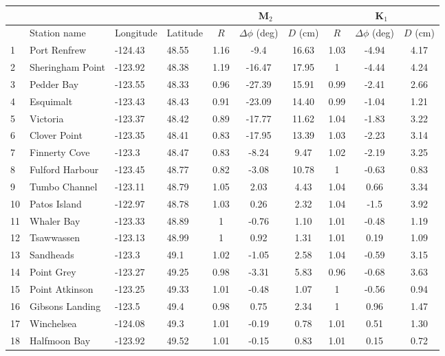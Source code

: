 \documentclass[pdftex,10pt]{article}
\begin{document}
\begin{table}[h]
\centering 
\begin{tabular}{l l l l c c c c c c} 
\hline 
& & & & \multicolumn{3}{c}{M$_2$} & \multicolumn{3}{c}{K$_1$} \\ 
\hline 
            & Station name     & Longitude & Latitude & $R$ & $ \Delta \phi$ (deg) & $D$ (cm) & $R$ & $ \Delta \phi$ (deg) & $D$ (cm) \\
\hline 
1 & Port Renfrew & -124.43 & 48.55 & 1.16 & -9.4 & 16.63  & 1.03 & -4.94 & 4.17 \\
2 & Sheringham Point & -123.92 & 48.38 & 1.19 & -16.47 & 17.95  & 1 & -4.44 & 4.24 \\
3 & Pedder Bay & -123.55 & 48.33 & 0.96 & -27.39 & 15.91  & 0.99 & -2.41 & 2.66 \\
4 & Esquimalt & -123.43 & 48.43 & 0.91 & -23.09 & 14.40  & 0.99 & -1.04 & 1.21 \\
5 & Victoria & -123.37 & 48.42 & 0.89 & -17.77 & 11.62  & 1.04 & -1.83 & 3.22 \\
6 & Clover Point & -123.35 & 48.41 & 0.83 & -17.95 & 13.39  & 1.03 & -2.23 & 3.14 \\
7 & Finnerty Cove & -123.3 & 48.47 & 0.83 & -8.24 & 9.47  & 1.02 & -2.19 & 3.25 \\
8 & Fulford Harbour & -123.45 & 48.77 & 0.82 & -3.08 & 10.78  & 1 & -0.63 & 0.83 \\
9 & Tumbo Channel & -123.11 & 48.79 & 1.05 & 2.03 & 4.43  & 1.04 & 0.66 & 3.34 \\
10 & Patos Island & -122.97 & 48.78 & 1.03 & 0.26 & 2.32  & 1.04 & -1.5 & 3.92 \\
11 & Whaler Bay & -123.33 & 48.89 & 1 & -0.76 & 1.10  & 1.01 & -0.48 & 1.19 \\
12 & Tsawwassen & -123.13 & 48.99 & 1 & 0.92 & 1.31  & 1.01 & 0.19 & 1.09 \\
13 & Sandheads & -123.3 & 49.1 & 1.02 & -1.05 & 2.58  & 1.04 & -0.59 & 3.15 \\
14 & Point Grey & -123.27 & 49.25 & 0.98 & -3.31 & 5.83  & 0.96 & -0.68 & 3.63 \\
15 & Point Atkinson & -123.25 & 49.33 & 1.01 & -0.48 & 1.07  & 1 & -0.56 & 0.94 \\
16 & Gibsons Landing & -123.5 & 49.4 & 0.98 & 0.75 & 2.34  & 1 & 0.96 & 1.47 \\
17 & Winchelsea & -124.08 & 49.3 & 1.01 & -0.19 & 0.78  & 1.01 & 0.51 & 1.30 \\
18 & Halfmoon Bay & -123.92 & 49.52 & 1.01 & -0.15 & 0.83  & 1.01 & 0.15 & 0.72\\ 

\end{tabular}
\end{table}
\end{document}
